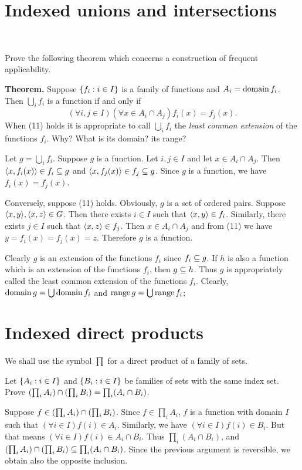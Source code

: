 \documentclass{report}
\begin{document}
\section{Indexed unions and intersections}\
\begin{exercise}
Prove the following theorem which concerns a construction of frequent applicability.

\textbf{Theorem.} Suppose $\left\{ f_i : i\in I \right\}$ is a family of functions and $A_i=\operatorname{domain} f_i$.
Then $\bigcup_i f_i$ is a function if and only if
\[(\forall i,j\in I)(\forall x\in A_i\cap A_j) f_i(x)=f_j(x).\tag{11} \]
When (11) holds it is appropriate to call $\bigcup_i f_i$ the
\textit{least common extension} of the functions $f_i$. Why? What is its domain? its range?
\end{exercise}

\begin{solution}
Let $g=\bigcup_i f_i$. Suppose $g$ is a function. Let $i,j\in I$ and let $x\in A_i\cap A_j$.
Then $\left\langle x, f_i(x)\right\rangle\in f_i\subseteq g$ and $\left\langle x, f_j(x)\right\rangle\in f_j\subseteq g$.
Since $g$ is a function, we have $f_i(x)=f_j(x)$.

Conversely, suppose (11) holds. Obviously, $g$ is a set of ordered pairs.
Suppose $\aprn{x,y},\aprn{x,z}\in G$.
Then there exists $i\in I$ such that $\left\langle x,y\right\rangle\in f_i$.
Similarly, there exists $j\in I$ such that $\left\langle x,z\right\rangle\in f_j$.
Then $x\in A_i\cap A_j$ and from (11) we have $y=f_i(x)=f_j(x)=z$.
Therefore $g$ is a function.

Clearly $g$ is an extension of the functions $f_i$ since $f_i\subseteq g$.
If $h$ is also a function which is an extension of the functions $f_i$, then $g\subseteq h$.
Thus $g$ is appropriately called
the least common extension of the functions $f_i$.
Clearly, $\operatorname{domain} g = \bigcup\operatorname{domain}{f_i}$ and $\operatorname{range} g = \bigcup \operatorname{range} f_i$;
\end{solution}

\section{Indexed direct products}
We shall use the symbol $\prod$ for a direct product of a family of sets.

\begin{exercise}
Let $\left\{ A_i : i\in I \right\}$ and $\left\{ B_i : i\in I \right\}$ be families of sets with the same index set.
Prove $\left(\prod_i A_i\right)\cap\left(\prod_i B_i\right) = \prod_i (A_i\cap B_i)$.
\end{exercise}

\begin{solution}
Suppose $f\in \left(\prod_i A_i\right)\cap\left(\prod_i B_i\right)$.
Since $f\in \prod_i A_i$, $f$ is a function with domain $I$ such that $(\forall i\in I)f(i)\in A_i$.
Similarly, we have $(\forall i\in I)f(i)\in B_i$.
But that means $(\forall i\in I)f(i)\in A_i\cap B_i$.
Thus $\prod_i (A_i\cap B_i)$, and $\left(\prod_i A_i\right)\cap\left(\prod_i B_i\right) \subseteq \prod_i (A_i\cap B_i)$.
Since the previous argument is reversible, we obtain also the opposite inclusion.
\end{solution}
\end{document}
